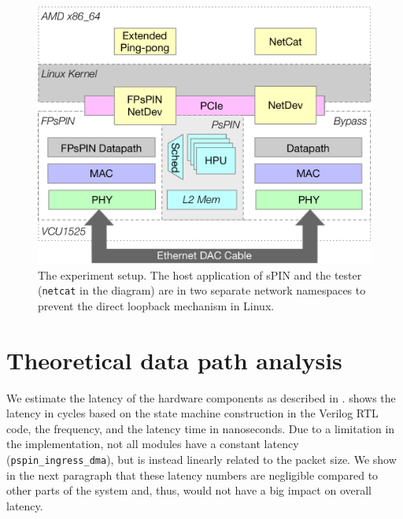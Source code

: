 \begin{figure}
    \centering
    \includegraphics[width=.9\linewidth]{figures/experiment-setup.pdf}
    \caption{The experiment setup.  The host application of sPIN and the tester (\texttt{netcat} in the diagram) are in two separate network namespaces to prevent the direct loopback mechanism in Linux.}
    \label{fig:experiment-setup}
\end{figure}

\section{Theoretical data path analysis} \label{sec:hw-latency-analysis}

We estimate the latency of the hardware components as described in .   shows the latency in cycles based on the state machine construction in the Verilog RTL code, the frequency, and the latency time in nanoseconds.  Due to a limitation in the implementation, not all modules have a constant latency (\texttt{pspin\_ingress\_dma}), but is instead linearly related to the packet size.  We show in the next paragraph that these latency numbers are negligible compared to other parts of the system and, thus, would not have a big impact on overall latency.

